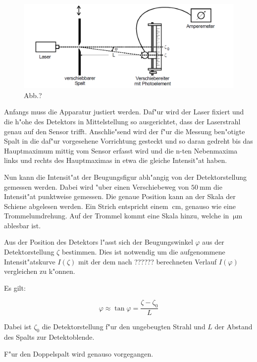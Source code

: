 			\begin{figure}[h]
					\centering
					\includegraphics[width = 14cm]{Versuchsaufbau.png}
					\caption{Abb.?}
					\label{Versuchsaufbau}
			\end{figure}

			Anfangs muss die Apparatur justiert werden. Daf"ur wird der Laser fixiert und die h"ohe des Detektors in Mittelstellung so ausgerichtet, dass der Laserstrahl genau auf den Sensor trifft. Anschlie"send wird der f"ur die Messung ben"otigte Spalt in die daf"ur vorgesehene Vorrichtung gesteckt und so daran gedreht bis das Hauptmaximum mittig vom Sensor erfasst wird und die n-ten Nebenmaxima links und rechts des Hauptmaximas in etwa die gleiche Intensit"at haben.

			Nun kann die Intensit"at der Beugungsfigur abh"angig von der Detektorstellung gemessen werden. Dabei wird "uber einen Verschiebeweg von $\SI{50}{\milli\meter}$ die Intensit"at punktweise gemessen. Die genaue Position kann an der Skala der Schiene abgelesen werden. Ein Strich entspricht einem $\SI{}{\centi \meter}$, genauso wie eine Trommelumdrehung. Auf der Trommel kommt eine Skala hinzu, welche in $\SI{}{\micro \meter}$ ablesbar ist.


			Aus der Position des Detektors l"asst sich der Beugungswinkel $\varphi$ aus der Detektorstellung $\zeta$ bestimmen. Dies ist notwendig um die aufgenommene Intensit"atskurve $I(\zeta)$ mit der dem nach ?????? berechneten Verlauf $I(\varphi)$ vergleichen zu k"onnen.

			Es gilt:

			\begin{equation}
				\varphi \approx \tan{\varphi} = \frac{\zeta - \zeta_0}{L}
			\end{equation}

			Dabei ist $\zeta_0$ die Detektorstellung f"ur den ungebeugten Strahl und $L$ der Abstand des Spalts zur Detektoblende.

			F"ur den Doppelspalt wird genauso vorgegangen.

